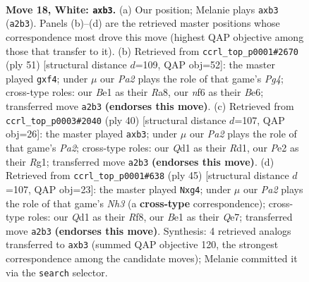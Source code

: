 \documentclass[11pt]{article}
\begin{document}
\clearpage

\begin{figure}[p]\centering
\begin{subfigure}{0.46\textwidth}\centering
\resizebox{\linewidth}{!}{%
\newchessgame
\chessboard[
  setfen={r1b1k2r/2p1qp2/2n2n2/3p2N1/p2P2Pp/1p5P/PPK1PPB1/R2QB2R w kq - 0 18},
  showmover=false,
  pgfstyle=straightmove, color=movearrow, markmove={a2-b3}
]}
\caption{}
\end{subfigure}\hfill
\begin{subfigure}{0.46\textwidth}\centering
\resizebox{\linewidth}{!}{%
\newchessgame
\chessboard[
  setfen={r2qr1k1/5pb1/4b2p/p2p2p1/1PnP1PP1/3Q2NP/4P1B1/R1B1R1K1 b - - 0 26},
  showmover=false,
  pgfstyle=straightmove, color=movearrow, markmove={g5-f4}
]}
\caption{}
\end{subfigure}
\\[4pt]
\begin{subfigure}{0.46\textwidth}\centering
\resizebox{\linewidth}{!}{%
\newchessgame
\chessboard[
  setfen={1r2k2r/2p2qb1/p1n1p1p1/3pP1Bp/5P1P/1pN5/P1PQ2P1/2KR2R1 w k - 0 21},
  showmover=false,
  pgfstyle=straightmove, color=movearrow, markmove={a2-b3}
]}
\caption{}
\end{subfigure}\hfill
\begin{subfigure}{0.46\textwidth}\centering
\resizebox{\linewidth}{!}{%
\newchessgame
\chessboard[
  setfen={r4rk1/4qp1p/p2p3n/2pPb3/2p1N1BN/4P1P1/PPQ2R1P/2K1R3 b - - 0 23},
  showmover=false,
  pgfstyle=straightmove, color=movearrow, markmove={h6-g4}
]}
\caption{}
\end{subfigure}
\caption{\textbf{Move 18, White: \texttt{axb3}.} (a) Our position; Melanie plays \texttt{axb3} (\texttt{a2b3}). Panels (b)--(d) are the retrieved master positions whose correspondence most drove this move (highest QAP objective among those that transfer to it). (b) Retrieved from \texttt{ccrl\_top\_p0001\#2670} (ply 51) [structural distance $d$=109, QAP obj=52]: the master played \texttt{gxf4}; under $\mu$ our \emph{Pa2} plays the role of that game's \emph{Pg4}; cross-type roles: our \emph{B}e1 as their \emph{R}a8, our \emph{n}f6 as their \emph{B}e6; transferred move \texttt{a2b3} \textbf{(endorses this move)}. (c) Retrieved from \texttt{ccrl\_top\_p0003\#2040} (ply 40) [structural distance $d$=107, QAP obj=26]: the master played \texttt{axb3}; under $\mu$ our \emph{Pa2} plays the role of that game's \emph{Pa2}; cross-type roles: our \emph{Q}d1 as their \emph{R}d1, our \emph{P}e2 as their \emph{R}g1; transferred move \texttt{a2b3} \textbf{(endorses this move)}. (d) Retrieved from \texttt{ccrl\_top\_p0001\#638} (ply 45) [structural distance $d$=107, QAP obj=23]: the master played \texttt{Nxg4}; under $\mu$ our \emph{Pa2} plays the role of that game's \emph{Nh3} (a \textbf{cross-type} correspondence); cross-type roles: our \emph{Q}d1 as their \emph{R}f8, our \emph{B}e1 as their \emph{Q}e7; transferred move \texttt{a2b3} \textbf{(endorses this move)}. Synthesis: 4 retrieved analogs transferred to \texttt{axb3} (summed QAP objective 120, the strongest correspondence among the candidate moves); Melanie committed it via the \texttt{search} selector.}
\label{fig:thought-m34}
\end{figure}
\end{document}
